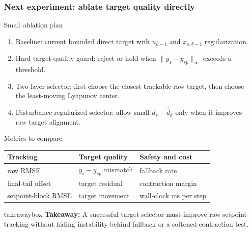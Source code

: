 \documentclass[aspectratio=169]{beamer}
\newcommand{\takeawaybox}[1]{%
\vspace{0.03cm}
\begin{center}
\begin{beamercolorbox}[wd=0.94\textwidth,sep=3pt,center,rounded=true,shadow=false]{takeawaybox}
\scriptsize
\textbf{\textcolor{maroon1}{Takeaway:}} #1
\end{beamercolorbox}
\end{center}
}
\begin{document}
\begin{frame}
\frametitle{\large \textbf{Next experiment: ablate target quality directly}}
\scriptsize

\begin{block}{Small ablation plan}
\begin{enumerate}\justifying
  \setlength\itemsep{0.35ex}
  \item Baseline: current bounded direct target with $u_{k-1}$ and $x_{s,k-1}$ regularization.
  \item Hard target-quality guard: reject or hold when $\|y_s-y_{sp}\|_\infty$ exceeds a threshold.
  \item Two-layer selector: first choose the closest trackable raw target, then choose the least-moving Lyapunov center.
  \item Disturbance-regularized selector: allow small $d_s-\hat d_k$ only when it improves raw target alignment.
\end{enumerate}
\end{block}

\begin{block}{Metrics to compare}
\begin{center}
\begin{tabular}{lll}
\toprule
Tracking & Target quality & Safety and cost \\
\midrule
raw RMSE & $y_s-y_{sp}$ mismatch & fallback rate \\
final-tail offset & target residual & contraction margin \\
setpoint-block RMSE & target movement & wall-clock ms per step \\
\bottomrule
\end{tabular}
\end{center}
\end{block}

\takeawaybox{A successful target selector must improve raw setpoint tracking without hiding instability behind fallback or a softened contraction test.}
\end{frame}
\end{document}
